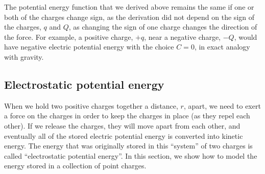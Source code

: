 The potential energy function that we derived above remains the same if one or both of the charges change sign, as the derivation did not depend on the sign of the charges, $q$ and $Q$, as changing the sign of one charge changes the direction of the force. For example, a positive charge, $+q$, near a negative charge, $-Q$, would have negative electric potential energy with the choice $C=0$, in exact analogy with gravity.

\subsection{Electrostatic potential energy}
When we hold two positive charges together a distance, $r$, apart, we need to exert a force on the charges in order to keep the charges in place (as they repel each other). If we release the charges, they will move apart from each other, and eventually all of the stored electric potential energy is converted into kinetic energy. The energy that was originally stored in this ``system'' of two charges is called ``electrostatic potential energy''. In this section, we show how to model the energy stored in a collection of point charges.

